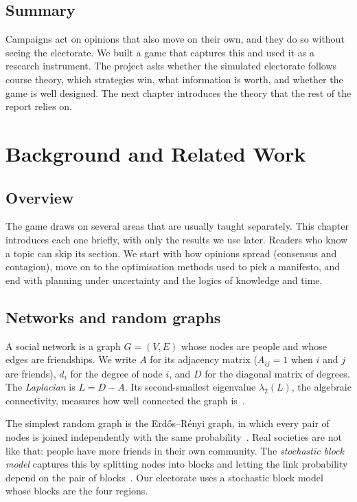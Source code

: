 \documentclass[11pt,a4paper,oneside]{report}
\newcommand{\overviewsection}{\section{Overview}}
\newcommand{\summarysection}{\section{Summary}}
\begin{document}
\summarysection

Campaigns act on opinions that also move on their own, and they do so without seeing the electorate. We
built a game that captures this and used it as a research instrument. The project asks whether the
simulated electorate follows course theory, which strategies win, what information is worth, and whether
the game is well designed. The next chapter introduces the theory that the rest of the report relies on.

\chapter{Background and Related Work}\label{ch:background}

\overviewsection

The game draws on several areas that are usually taught separately. This chapter introduces each one
briefly, with only the results we use later. Readers who know a topic can skip its section. We start with
how opinions spread (consensus and contagion), move on to the optimisation methods used to pick a
manifesto, and end with planning under uncertainty and the logics of knowledge and time.

\section{Networks and random graphs}

A social network is a graph $G=(V,E)$ whose nodes are people and whose edges are friendships. We write $A$
for its adjacency matrix ($A_{ij}=1$ when $i$ and $j$ are friends), $d_i$ for the degree of node $i$, and
$D$ for the diagonal matrix of degrees. The \emph{Laplacian} is $L=D-A$. Its second-smallest eigenvalue
$\lambda_2(L)$, the algebraic connectivity, measures how well connected the graph is~\cite{fiedler1973}.

The simplest random graph is the Erd\H{o}s--R\'enyi graph, in which every pair of nodes is joined
independently with the same probability~\cite{erdos1959}. Real societies are not like that: people have
more friends in their own community. The \emph{stochastic block model} captures this by splitting nodes
into blocks and letting the link probability depend on the pair of blocks~\cite{holland1983}. Our
electorate uses a stochastic block model whose blocks are the four regions.
\end{document}

